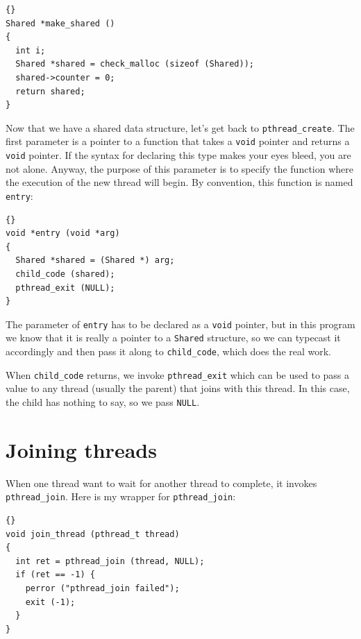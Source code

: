 \documentclass{book}
\begin{document}
\begin{latin}
\begin{lstlisting}[title={}]{}
Shared *make_shared ()
{
  int i;
  Shared *shared = check_malloc (sizeof (Shared));
  shared->counter = 0;
  return shared;
}
\end{lstlisting}
\end{latin}

Now that we have a shared data structure, let's get back to
{\tt pthread\_create}.
The first parameter is a pointer to a function that takes
a {\tt void} pointer and returns a {\tt void} pointer.  If the syntax
for declaring this type makes your eyes bleed, you are not alone.
Anyway, the purpose of this parameter is to specify the function where
the execution of the new thread will begin.  By convention, this
function is named {\tt entry}:

\begin{latin}
\begin{lstlisting}[title={}]{}
void *entry (void *arg)
{
  Shared *shared = (Shared *) arg;
  child_code (shared);
  pthread_exit (NULL);
}
\end{lstlisting}
\end{latin}

The parameter of {\tt entry} has to be declared as a {\tt void}
pointer, but in this program we know that it is really a pointer to a
{\tt Shared} structure, so we can typecast it accordingly and then
pass it along to {\tt child\_code}, which does the real work.

When {\tt child\_code} returns, we invoke {\tt pthread\_exit}
which can be used to pass a value to any thread (usually the
parent) that joins with this thread.  In this case, the child
has nothing to say, so we pass {\tt NULL}.


\section{Joining threads}

When one thread want to wait for another thread to complete,
it invokes {\tt pthread\_join}.
Here is my wrapper for {\tt pthread\_join}:

\begin{latin}
\begin{lstlisting}[title={}]{}
void join_thread (pthread_t thread)
{
  int ret = pthread_join (thread, NULL);
  if (ret == -1) {
    perror ("pthread_join failed");
    exit (-1);
  }
}
\end{lstlisting}
\end{latin}
\end{document}
